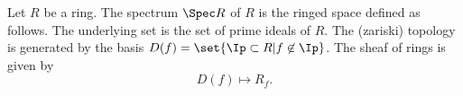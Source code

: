\begin{definition}
Let $R$ be a ring.
The spectrum $\Spec R$ of $R$ is the ringed space defined as follows.
The underlying set is the set of prime ideals of $R$.
The (zariski) topology is generated by the basis $D(f) = \set{\Ip \subset R | f\not\in\Ip}$.
The sheaf of rings is given by 
\[D(f) \mapsto R_f.\]
\end{definition}